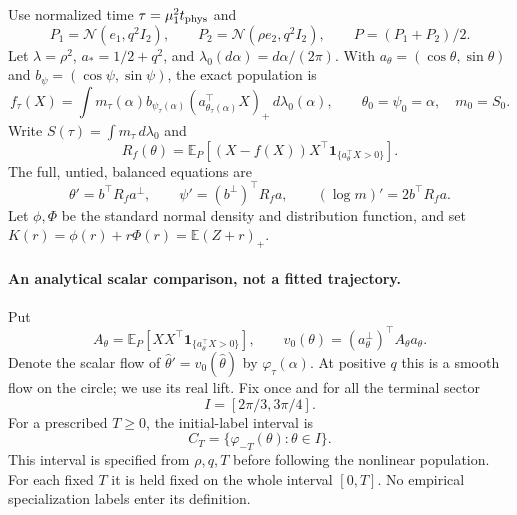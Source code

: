 \documentclass[11pt]{article}
\numberwithin{equation}{section}
\theoremstyle{remark}
\newcommand{\E}{\mathbb E}
\newcommand{\dd}{\,d}
\newcommand{\ind}{\mathbf1}
\begin{document}
Use normalized time $\tau=\mu_1^2t_{\rm phys}$ and
\[
 P_1=\mathcal N(e_1,q^2I_2),\qquad
 P_2=\mathcal N(\rho e_2,q^2I_2),\qquad P=(P_1+P_2)/2.
\]
Let $\lambda=\rho^2$, $a_*=1/2+q^2$, and
$\lambda_0(d\alpha)=d\alpha/(2\pi)$. With
$a_\theta=(\cos\theta,\sin\theta)$ and
$b_\psi=(\cos\psi,\sin\psi)$, the exact population is
\[
 f_\tau(X)=\int m_\tau(\alpha)b_{\psi_\tau(\alpha)}
       (a_{\theta_\tau(\alpha)}^\top X)_+\dd\lambda_0(\alpha),
 \qquad \theta_0=\psi_0=\alpha,\quad m_0=S_0.
\]
Write $S(\tau)=\int m_\tau\dd\lambda_0$ and
\[
 R_f(\theta)=\E_P[(X-f(X))X^\top\ind_{\{a_\theta^\top X>0\}}].
\]
The full, untied, balanced equations are
\begin{equation}\label{inc:AN02:arrival:v1:flow}
 \theta'=b^\top R_fa^\perp,\qquad
 \psi'=(b^\perp)^\top R_fa,\qquad
 (\log m)'=2b^\top R_fa.
\end{equation}
Let $\phi,\Phi$ be the standard normal density and distribution function,
and set $K(r)=\phi(r)+r\Phi(r)=\E(Z+r)_+$.

\paragraph{An analytical scalar comparison, not a fitted trajectory.}
Put
\[
 A_\theta=\E_P[XX^\top\ind_{\{a_\theta^\top X>0\}}],\qquad
 v_0(\theta)=(a_\theta^\perp)^\top A_\theta a_\theta.
\]
Denote the scalar flow of $\widehat\theta'=v_0(\widehat\theta)$ by
$\varphi_\tau(\alpha)$. At positive $q$ this is a smooth flow on the circle;
we use its real lift. Fix once and for all the terminal sector
\begin{equation}\label{inc:AN02:arrival:v1:sector}
 I=[2\pi/3,3\pi/4].
\end{equation}
For a prescribed $T\ge0$, the initial-label interval is
\begin{equation}\label{inc:AN02:arrival:v1:cohort}
 C_T=\{\varphi_{-T}(\theta):\theta\in I\}.
\end{equation}
This interval is specified from $\rho,q,T$ before following the nonlinear
population. For each fixed $T$ it is held fixed on the whole interval
$[0,T]$. No empirical specialization labels enter its definition.
\end{document}
